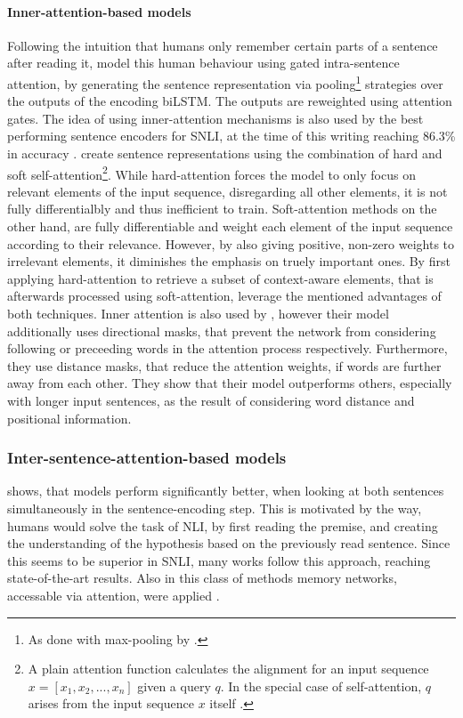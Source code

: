 \paragraph*{Inner-attention-based models}
Following the intuition that humans only remember certain parts of a sentence after reading it, \cite{chen2017recurrent} model this human behaviour using gated intra-sentence attention, by generating the sentence representation via pooling\footnote{As done with max-pooling by \cite{nie2017shortcut}.} strategies over the outputs of the encoding \ac{biLSTM}. The outputs are reweighted using  attention gates. The idea of using inner-attention mechanisms is also used by the best performing sentence encoders for \ac{SNLI}, at the time of this writing reaching 86.3\% in accuracy \citep{shen2018reinforced,im2017distance}. \cite{shen2018reinforced} create sentence representations using the combination of hard and soft self-attention\footnote{A plain attention function calculates the alignment for an input sequence $x=[x_1, x_2, ...,x_n]$ given a query $q$. In the special case of self-attention, $q$ arises from the input sequence $x$ itself \citep{shen2018reinforced}.}. While hard-attention forces the model to only focus on relevant elements of the input sequence, disregarding all other elements, it is not fully differentialbly and thus inefficient to train. Soft-attention methods on the other hand, are fully differentiable and weight each element of the input sequence according to their relevance. However, by also giving positive, non-zero weights to irrelevant elements, it diminishes the emphasis on truely important ones. By first applying hard-attention to retrieve a subset of context-aware elements, that is afterwards processed using soft-attention, \cite{shen2018reinforced} leverage the mentioned advantages of both techniques. Inner attention is also used by \cite{im2017distance}, however their model additionally uses directional masks, that prevent the network from considering following or preceeding words in the attention process respectively. Furthermore, they use distance masks, that reduce the attention weights, if words are further away from each other. They show that their model outperforms others, especially with longer input sentences, as the result of considering word distance and positional information.

\subsubsection{Inter-sentence-attention-based models}\label{sec:rel_work_sentence_encoding_models}
\cite{rocktaschel2015reasoning} shows, that models perform significantly better, when looking at both sentences simultaneously in the sentence-encoding step. This is motivated by the way, humans would solve the task of \ac{NLI}, by first reading the premise, and creating the understanding of the hypothesis based on the previously read sentence. Since this seems to be superior in \ac{SNLI}, many works follow this approach, reaching state-of-the-art results. Also in this class of methods memory networks, accessable via attention, were applied \citep{cheng2016long}.

